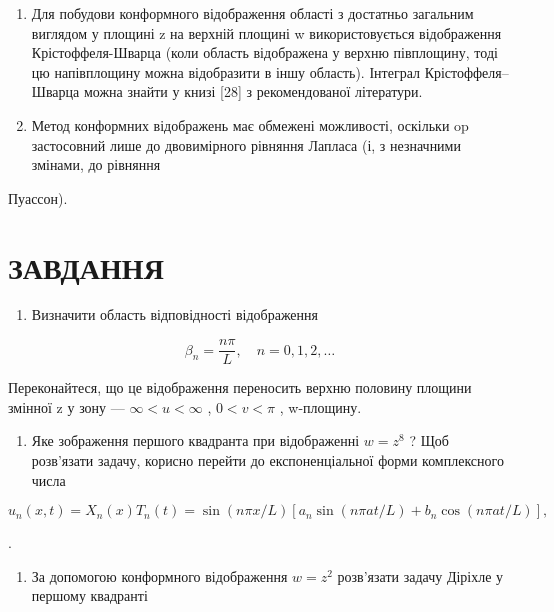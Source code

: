 \documentclass[
  ukrainian,
]{article}
\providecommand{\tightlist}{%
  \setlength{\itemsep}{0pt}\setlength{\parskip}{0pt}}
\begin{document}
\begin{enumerate}
\def\labelenumi{\arabic{enumi}.}
\item
  Для побудови конформного відображення області з достатньо загальним
  виглядом у площині z на верхній площині w використовується
  відображення Крістоффеля-Шварца (коли область відображена у верхню
  півплощину, тоді цю напівплощину можна відобразити в іншу область).
  Інтеграл Крістоффеля--Шварца можна знайти у книзі {[}28{]} з
  рекомендованої літератури.
\item
  Метод конформних відображень має обмежені можливості, оскільки op
  застосовний лише до двовимірного рівняння Лапласа (і, з незначними
  змінами, до рівняння
\end{enumerate}

Пуассон).

\section{ЗАВДАННЯ}\label{ux437ux430ux432ux434ux430ux43dux43dux44f-11}

\begin{enumerate}
\def\labelenumi{\arabic{enumi}.}
\tightlist
\item
  Визначити область відповідності відображення
\end{enumerate}

\[
\beta_n = \frac{n\pi}{L}, \quad n = 0, 1, 2, \ldots
\]

Переконайтеся, що це відображення переносить верхню половину площини
змінної z у зону --- \(\infty < u < \infty\) , \(0 < v < \pi\) ,
w-площину.

\begin{enumerate}
\def\labelenumi{\arabic{enumi}.}
\setcounter{enumi}{1}
\tightlist
\item
  Яке зображення першого квадранта при відображенні \(w=z^{8}\) ? Щоб
  розв'язати задачу, корисно перейти до експоненціальної форми
  комплексного числа
\end{enumerate}

\[
u_n(x, t) = X_n(x) T_n(t) = \sin(n\pi x/L) [a_n \sin(n\pi at/L) + b_n \cos(n\pi at/L)],
\]

.

\begin{enumerate}
\def\labelenumi{\arabic{enumi}.}
\setcounter{enumi}{2}
\tightlist
\item
  За допомогою конформного відображення \(w=z^2\) розв'язати задачу
  Діріхле у першому квадранті
\end{enumerate}
\end{document}
